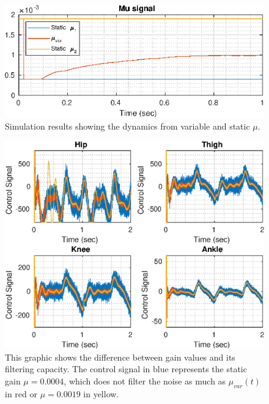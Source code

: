 \documentclass[letterpaper, 10 pt, conference]{ieeeconf}  %
\theoremstyle{plain}
\theoremstyle{definition}
\theoremstyle{remark}
\begin{document}
%
\begin{figure}[h!]
	\begin{center}
	\includegraphics[width = \columnwidth]{Figs/mu_comparison.eps}
	\caption{Simulation results showing the dynamics from variable and static $\mu$.}
	\label{fig:mu_comparison}
	\end{center}
\end{figure}
%
%
\begin{figure}[h!]
	\begin{center}
	\includegraphics[width = \columnwidth]{Figs/u_comparison.eps}
	\caption{This graphic shows the difference between gain values and its filtering capacity. The control signal in blue represents the static gain $\mu = 0.0004$, which does not filter the noise as much as $\mu_{var}(t)$ in red or $\mu = 0.0019$ in yellow.}
	\label{fig:u_comparison}
	\end{center}
\end{figure}
%
%
\end{document}

